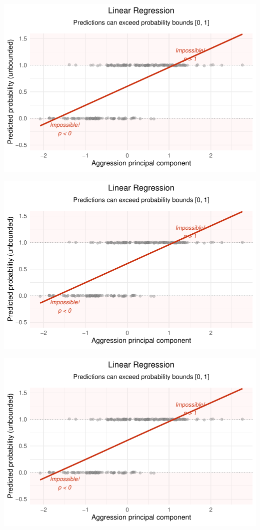 \documentclass[
  letterpaper,
  DIV=11,
  numbers=noendperiod]{scrartcl}
\begin{document}
\begin{center}
\includegraphics[width=0.8\linewidth,height=\textheight,keepaspectratio]{Beyond!!!_files/figure-pdf/unnamed-chunk-4-24.pdf}
\end{center}

\begin{center}
\includegraphics[width=0.8\linewidth,height=\textheight,keepaspectratio]{Beyond!!!_files/figure-pdf/unnamed-chunk-4-25.pdf}
\end{center}

\begin{center}
\includegraphics[width=0.8\linewidth,height=\textheight,keepaspectratio]{Beyond!!!_files/figure-pdf/unnamed-chunk-4-26.pdf}
\end{center}
\end{document}
